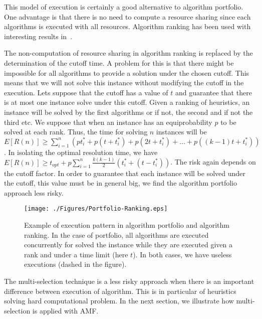 This model of execution is certainly a good alternative to algorithm portfolio. One advantage is 
that there is no need to compute a resource sharing since each algorithms is executed with all 
resources. Algorithm ranking has been used with interesting results in~\cite{Satzilla}. 

The non-computation of resource sharing in algorithm ranking is repĺaced by the determination of 
the cutoff time. A problem for this is that there might be impossible for all algorithms to provide a solution under the chosen cutoff. This  means that we will not solve this instance without modifying 
 the cutoff in the execution. Lets suppose that the cutoff has a 
value of $t$  and guarantee that there is at most one instance solve under this cutoff. Given a ranking of 
heuristics, an instance will be solved by the first algorithms or if not, the second and if not the third etc. 
We suppose that when an instance has an equiprobability $p$ to be solved at each rank. Thus, the time for solving $n$ instances will be  
$E[R(n)] \geq \sum_{i=1}^n (pt_i^* + p(t + t_i^*) + p(2t + t_i^*) + \dots + p((k-1)t + t_i^*) )$. 
In isolating the optimal resolution time, we have $E[R(n)] \geq t_{opt} + p\sum_{i=1}^n \frac{k(k-1)}{2}(t_i^* + (t-t_i^*)) $. 
The risk again depends on the cutoff factor. In order to guarantee that each instance will be solved under 
the cutoff, this value must be in general big, we find the algorithm portfolio approach less risky.


\begin{figure}[!htbp]
\begin{center}
\texttt{[image: ./Figures/Portfolio-Ranking.eps]}
\caption{Example of execution pattern in algorithm portfolio and algorithm ranking. In the 
case of portfolio, all algorithms are executed concurrently for solved the instance while they 
are executed given a rank and under a time limit (here $t$). In both cases, we have useless 
executions (dashed in the figure).}
 \label{Arch}
\end{center}
\end{figure}

The multi-selection technique is a less risky approach when there is an important difference between 
execution of algorithm. This is in particular of heuristics solving hard computational problem. 
In the next section, we illustrate how multi-selection is applied with AMF.

